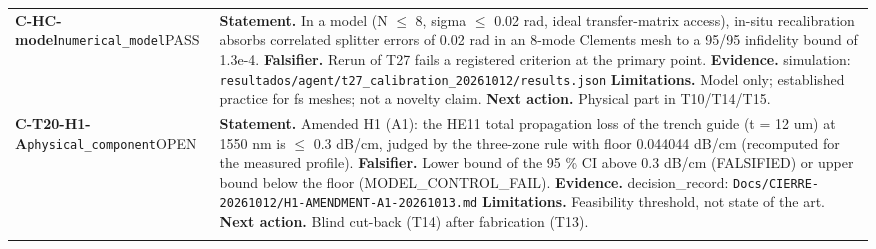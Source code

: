 \begin{longtable}{@{}>{\raggedright\arraybackslash}p{2.35cm}>{\raggedright\arraybackslash}p{13.2cm}@{}}
\textbf{C-HC-model}\newline \texttt{numerical\_\allowbreak{}model}\newline PASS & \textbf{Statement.} In a model (N $\le$ 8, sigma $\le$ 0.02 rad, ideal transfer-matrix access), in-situ recalibration absorbs correlated splitter errors of 0.02 rad in an 8-mode Clements mesh to a 95/\allowbreak{}95 infidelity bound of 1.3e-4. \newline \textbf{Falsifier.} Rerun of T27 fails a registered criterion at the primary point. \newline \textbf{Evidence.} simulation: \texttt{resultados/\allowbreak{}agent/\allowbreak{}t27\_\allowbreak{}calibration\_\allowbreak{}20261012/\allowbreak{}results.json} \newline \textbf{Limitations.} Model only; established practice for fs meshes; not a novelty claim. \newline \textbf{Next action.} Physical part in T10/\allowbreak{}T14/\allowbreak{}T15. \\ \addlinespace[2pt]
\textbf{C-T20-H1-A}\newline \texttt{physical\_\allowbreak{}component}\newline OPEN & \textbf{Statement.} Amended H1 (A1): the HE11 total propagation loss of the trench guide (t = 12 um) at 1550 nm is $\le$ 0.3 dB/\allowbreak{}cm, judged by the three-zone rule with floor 0.044044 dB/\allowbreak{}cm (recomputed for the measured profile). \newline \textbf{Falsifier.} Lower bound of the 95 \% CI above 0.3 dB/\allowbreak{}cm (FALSIFIED) or upper bound below the floor (MODEL\_\allowbreak{}CONTROL\_\allowbreak{}FAIL). \newline \textbf{Evidence.} decision\_\allowbreak{}record: \texttt{Docs/\allowbreak{}CIERRE-20261012/\allowbreak{}H1-AMENDMENT-A1-20261013.md} \newline \textbf{Limitations.} Feasibility threshold, not state of the art. \newline \textbf{Next action.} Blind cut-back (T14) after fabrication (T13). \\ \addlinespace[2pt]

\end{longtable}
